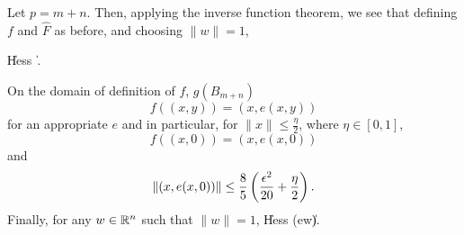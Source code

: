 \documentclass[final, 12pt]{colt2018} %
\begin{document}
Let $p = m+n$. Then, applying the inverse function theorem, we see that defining $f$ and $\hat F$ as before, and choosing $\|w\|= 1$, 

\beq{} \left\|Hess\, \right\|  \leq {}. \eeq

\begin{lemma}
On the domain of definition of $f$, \ie $g(B_{m+n})$ 
$$f ((x, y)) = (x, e(x, y))$$ for an appropriate $e$ and in particular, for $\|x\| \leq \frac{\eta}{2}$, where $\eta \in [0, 1]$,
$$f((x, 0)) = (x, e(x, 0))$$ and $$\|(x, e(x, 0))\| \leq \frac{8}{5}\left( \frac{{\epsilon}^2}{20} + \frac{\eta}{2}\right).$$
 Finally, for any $w \in \mathbb R^n$ such that $\|w\| = 1$, 
\beq \|Hess (e\cdot w)\| \leq {}.\eeq
\end{lemma}
\end{document}
